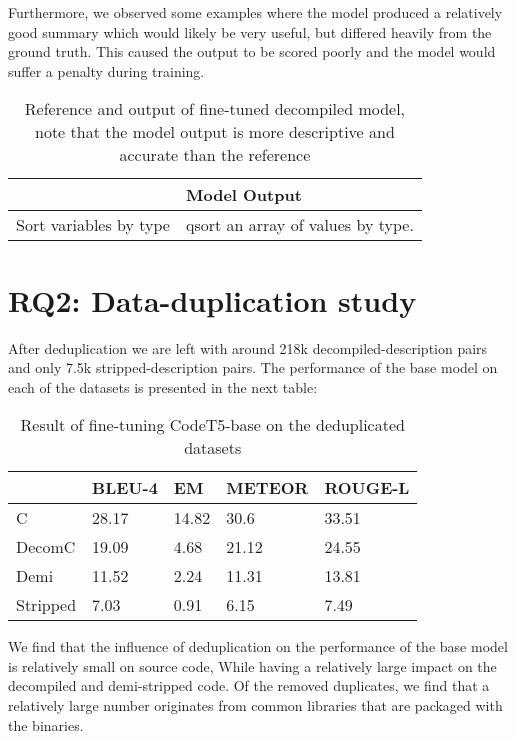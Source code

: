 Furthermore, we observed some examples where the model produced a relatively good summary which would likely be very useful, but differed heavily from the ground truth. This caused the output to be scored poorly and the model would suffer a penalty during training.
\label{tab:betterOutput}
\begin{table}[!h]
\centering
\begin{tabular}{ll}
\hline
\rowcolor[HTML]{9B9B9B} 
\multicolumn{1}{|l}{\cellcolor[HTML]{9B9B9B}Reference} & \multicolumn{1}{l|}{\cellcolor[HTML]{9B9B9B}Model Output} \\ \hline
Sort variables by type                                 & qsort an array of values by type.       
\end{tabular}
\caption{Reference and output of fine-tuned decompiled model, note that the model output is more descriptive and accurate than the reference}
\end{table}


\section{RQ2: Data-duplication study}
After deduplication we are left with around 218k decompiled-description pairs and only 7.5k stripped-description pairs. The performance of the base model on each of the datasets is presented in the next table:

\label{tab:deduplicated}
\begin{table}[!h]
\centering
\caption{Result of fine-tuning CodeT5-base on the deduplicated datasets}
\begin{tabular}{lllll} 
\hline
\rowcolor[rgb]{0.749,0.749,0.749} \multicolumn{1}{|l}{\textbf{Deduplicated}} & BLEU-4 & EM    & METEOR & \multicolumn{1}{l|}{ROUGE-L}  \\ 
\hline
C                                                                            & 28.17  & 14.82 & 30.6  &  33.51                             \\
DecomC                                                                       & 19.09  & 4.68  & 21.12  &  24.55                             \\
Demi                                                                         & 11.52  & 2.24  & 11.31  &  13.81
                             \\
Stripped                                                                     & 7.03   & 0.91  & 6.15  &  7.49                            
\end{tabular}
\end{table}
We find that the influence of deduplication on the performance of the base model is relatively small on source code, While having a relatively large impact on the decompiled and demi-stripped code. 
Of the removed duplicates, we find that a relatively large number originates from common libraries that are packaged with the binaries. 

